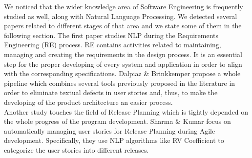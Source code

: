 \begin{table}
\caption{SLRs identified about NLP and Software Testing}
\label{table1}
\end{table}

We noticed that the wider knowledge area of Software Engineering is frequently studied as well, along with Natural Language Processing. We detected several papers related 
to different stages of that area and we state some of them in the following section. The first paper studies NLP during the Requirements Engineering (RE) process. 
RE contains activities related to maintaining, managing and creating the requirements in the design process. It is an essential step for the proper developing of 
every system and application in order to align with the corresponding specifications. Dalpiaz \& Brinkkemper \cite{reqeng1} propose a whole pipeline 
which combines several tools previously proposed in the literature in order to eliminate textual defects in user stories and, thus, to make the developing 
of the product architecture an easier process. \\

Another study touches the field of Release Planning which is tightly depended on the whole progress of the 
program development. Sharma \& Kumar \cite{8701252} focus on automatically managing user stories for Release Planning during Agile development. Specifically, 
they use NLP algorithms like RV Coefficient to categorize the user stories into different releases.\\

